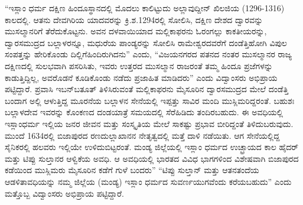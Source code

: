 “ಇಸ್ಲಾಂ ಧರ್ಮ ದಕ್ಷಿಣ ಹಿಂದೂಸ್ಥಾನದಲ್ಲಿ ಮೊದಲು ಕಾಲಿಟ್ಟುದು ಅಲ್ಲಾವುದ್ದೀನ್​ ಖಿಲಜಿಯ (1296-1316) ಕಾಲದಲ್ಲಿ. ಆತನು ದೇವಗಿರಿಯ ಯಾದವರನ್ನು ಕ್ರಿ.ಶ.1294ರಲ್ಲಿ ಸೋಲಿಸಿ, ದಕ್ಷಿಣ ದೇಶದ ದ್ವಾರವನ್ನು ಮುಸಲ್ಮಾನರಿಗೆ ತೆರೆದುಕೊಟ್ಟನು. ಅವನ ದಳವಾಯಿಯಾದ ಮಲ್ಲಿಕಾಫರನು ಓರಂಗಲ್ಲು ಕಾಕತೀಯರನ್ನು, ದ್ವಾರಸಮುದ್ರದ ಬಲ್ಲಾಳರನ್ನೂ, ಮಧುರೆಯ ಪಾಂಡ್ಯರನ್ನು ಸೋಲಿಸಿ ರಾಮೇಶ್ವರದವರೆಗೆ ದಂಡೆತ್ತಿಹೋಗಿ ವಿಪುಲ ಸಂಪತ್ತನ್ನು ಹೇರಿಕೊಂಡು ದಿಲ್ಲಿಗೆ\break ಹಿಂದಿರುಗಿದನು” ಎಂದು, “ವಿಜಯನಗರದ ಪತನದ ನಂತರ ಮುಸಲ್ಮಾನರ ರಾಜ್ಯ ದಕ್ಷಿಣದಲ್ಲಿ ಸುಲಭವಾಗಿ ಪಸರಿಸಿತು, ಇವರು ಉತ್ತರದ ಮುಸಲ್ಮಾನ ರಾಜರಂತೆ ತಮ್ಮ ಹಿಂದೂ ಪ್ರಜೆಗಳನ್ನು ಕಾಡುತ್ತಿದ್ದಿಲ್ಲ, ಅವರೊಡನೆ ಕೂಡಿಕೊಂಡು ನಡೆದು ಪ್ರಜಾಹಿತ ಮಾಡಿದರು” ಎಂದು ವಿದ್ವಾಂಸರು ಅಭಿಪ್ರಾಯ ಪಟ್ಟಿದ್ದಾರೆ. ಪ್ರವಾಸಿ ಇಬನ್​ಬತೂತ್​ ತಿಳಿಸಿರುವಂತೆ ಮಲ್ಲಿಕಾಫರನು ಮೈಸೂರಿನ ದ್ವಾರಸಮುದ್ರದ ಮೇಲೆ ದಂಡೆತ್ತಿ ಬಂದಾಗ ಅಲ್ಲಿ ಆಳುತ್ತಿದ್ದ ಮೂರನೆಯ ಬಲ್ಲಾಳನ ಸೇನೆಯಲ್ಲಿ ಇಪ್ಪತ್ತು ಸಾವಿರ ಮಂದಿ ಮುಸ್ಲಿಮರಿದ್ದರಂತೆ. ಬಹುಶಃ ಬಲ್ಲಾಳದೇವ ಇವರನ್ನು ಕೊಂಕಣದ ದಂಡಯಾತ್ರೆ ಸಮಯದಲ್ಲಿ ಸೆರೆಹಿಡಿದು ತಂದಿರಬಹುದು. ಈ ಅವಧಿಯಲ್ಲಿ ಇಸ್ಲಾಂಧರ್ಮ ಇಲ್ಲಿಯ ಜನರ ಜೀವನ ಮತ್ತು ಸಂಸ್ಕೃತಿಯ ಮೇಲೆ ಸಾಕಷ್ಟು ಪ್ರಭಾವ ಬೀರಿದ್ದಂತೆ ತಿಳಿದುಬರುವುದು. ಮುಂದೆ 1634ರಲ್ಲಿ ಬಿಜಾಪುರದ ರಣದುಲ್ಲಾಖಾನನ ನೇತೃತ್ವದಲ್ಲಿ ಮತ್ತೆ ದಾಳಿ ನಡೆಯಿತು. ಆಗ ಸೇನೆಯಲ್ಲಿದ್ದ ಸೈನಿಕರಲ್ಲಿ ಹಲವರು ಇಲ್ಲಿಯೇ ಉಳಿದುಬಿಟ್ಟರಂತೆ. ಮಂಡ್ಯ ಜಿಲ್ಲೆಯಲ್ಲಿ ಇಸ್ಲಾಂ ಧರ್ಮದ ಉಚ್ಛ್ರಾಯದ ಕಾಲ ಹೈದರ್​ ಮತ್ತು ಟಿಪ್ಪು ಸುಲ್ತಾನರ ಆಳ್ವಿಕೆಯ ಅವಧಿ. ಆ ಅವಧಿಯಲ್ಲಿ ಭಾರತದ ವಿವಿಧ ಭಾಗಗಳಿಂದ ವಿಶೇಷವಾಗಿ ಬಿಜಾಪುರದ ಕಡೆಯಿಂದ ಮುಸ್ಲಿಮರು ಮೈಸೂರಿನ ಕಡೆಗೆ ಗುಳೆ ಬಂದರು” “ಟಿಪ್ಪು ಸುಲ್ತಾನ್​ ಮತ್ತು ಆತನ\break ತಂದೆಯ ಆಡಳಿತಾವಧಿಯನ್ನು ನಮ್ಮ ಜಿಲ್ಲೆಯ (ಮಂಡ್ಯ) ಇಸ್ಲಾಂ ಧರ್ಮದ ಸುವರ್ಣಯುಗವೆಂದು ಕರೆಯಬಹುದು” ಎಂದು ಮತ್ತೊಬ್ಬ ವಿದ್ವಾಂಸರು ಅಭಿಪ್ರಾಯ ಪಟ್ಟಿದ್ದಾರೆ.

